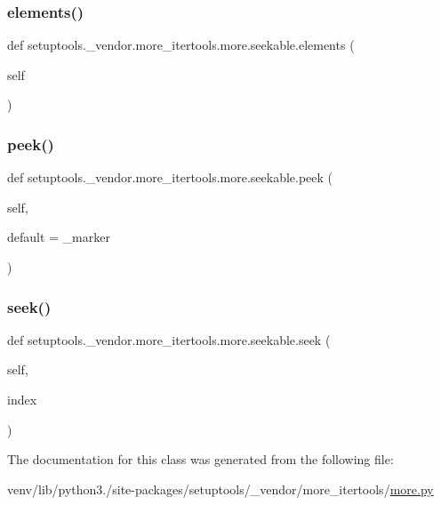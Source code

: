 \subsubsection{\texorpdfstring{elements()}{elements()}}
{\footnotesize\ttfamily def setuptools.\+\_\+vendor.\+more\+\_\+itertools.\+more.\+seekable.\+elements (\begin{DoxyParamCaption}\item[{}]{self }\end{DoxyParamCaption})}

\mbox{\label{classsetuptools_1_1__vendor_1_1more__itertools_1_1more_1_1seekable_ad9a0b9728a6a89c7dbc1e19a97b726f4}} 
\subsubsection{\texorpdfstring{peek()}{peek()}}
{\footnotesize\ttfamily def setuptools.\+\_\+vendor.\+more\+\_\+itertools.\+more.\+seekable.\+peek (\begin{DoxyParamCaption}\item[{}]{self,  }\item[{}]{default = {\ttfamily \+\_\+marker} }\end{DoxyParamCaption})}

\mbox{\label{classsetuptools_1_1__vendor_1_1more__itertools_1_1more_1_1seekable_a0ee3ec0cd776f2589ff9851a5a06655b}} 
\subsubsection{\texorpdfstring{seek()}{seek()}}
{\footnotesize\ttfamily def setuptools.\+\_\+vendor.\+more\+\_\+itertools.\+more.\+seekable.\+seek (\begin{DoxyParamCaption}\item[{}]{self,  }\item[{}]{index }\end{DoxyParamCaption})}



The documentation for this class was generated from the following file\+:\begin{DoxyCompactItemize}
\item 
venv/lib/python3./site-\/packages/setuptools/\+\_\+vendor/more\+\_\+itertools/\hyperlink{more_8py}{more.\+py}\end{DoxyCompactItemize}
